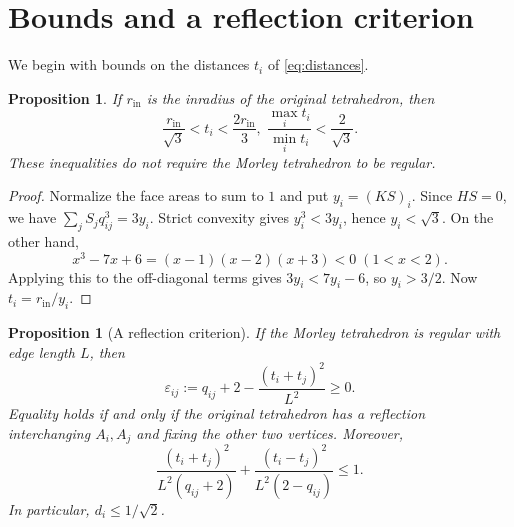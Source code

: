 \documentclass[11pt]{article}
\newtheorem{proposition}[theorem]{Proposition}
\theoremstyle{definition}
\theoremstyle{remark}
\begin{document}
\section{Bounds and a reflection criterion}
\label{sec:bounds}

We begin with bounds on the distances $t_i$ of \eqref{eq:distances}.

\begin{proposition}
\label{prop:distancebounds}
If $r_{\mathrm{in}}$ is the inradius of the original tetrahedron, then
\[
\frac{r_{\mathrm{in}}}{\sqrt3}<t_i<\frac{2r_{\mathrm{in}}}{3},
\; \frac{\max_i t_i}{\min_i t_i}<\frac2{\sqrt3}.
\]
These inequalities do not require the Morley tetrahedron to be regular.
\end{proposition}

\begin{proof}
Normalize the face areas to sum to $1$ and put $y_i=(KS)_i$. Since $HS=0$, we have $\sum_jS_jq_{ij}^3=3y_i$. Strict convexity gives $y_i^3<3y_i$, hence $y_i<\sqrt3$. On the other hand,
\[
x^3-7x+6=(x-1)(x-2)(x+3)<0\;(1<x<2).
\]
Applying this to the off-diagonal terms gives $3y_i<7y_i-6$, so $y_i>3/2$. Now $t_i=r_{\mathrm{in}}/y_i$.
\end{proof}

\begin{proposition}[A reflection criterion]
\label{prop:defect}
If the Morley tetrahedron is regular with edge length $L$, then
\begin{equation}
\varepsilon_{ij}:=q_{ij}+2-\frac{(t_i+t_j)^2}{L^2}\ge0.
\label{eq:defect}
\end{equation}
Equality holds if and only if the original tetrahedron has a reflection interchanging $A_i,A_j$ and fixing the other two vertices. Moreover,
\begin{equation}
\frac{(t_i+t_j)^2}{L^2(q_{ij}+2)}
+\frac{(t_i-t_j)^2}{L^2(2-q_{ij})}\le1.
\label{eq:ellipse}
\end{equation}
In particular, $d_i\le1/\sqrt2$.
\end{proposition}
\end{document}
